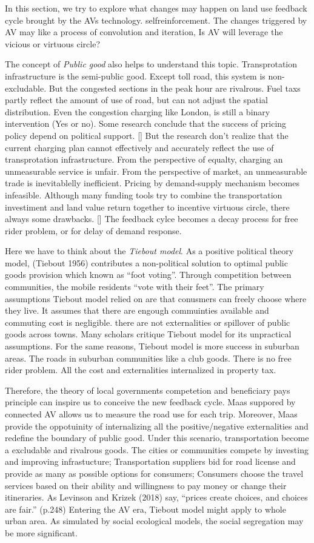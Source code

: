 \documentclass[12pt,]{article}
\begin{document}
In this section, we try to explore what changes may happen on land use
feedback cycle brought by the AVs technology. selfreinforcement. The
changes triggered by AV may like a process of convolution and iteration,
Is AV will leverage the vicious or virtuous circle?

The concept of \emph{Public good} also helps to understand this topic.
Transprotation infrastructure is the semi-public good. Except toll road,
this system is non-excludable. But the congested sections in the peak
hour are rivalrous. Fuel taxs partly reflect the amount of use of road,
but can not adjust the spatial distribution. Even the congestion
charging like London, is still a binary intervention (Yes or no). Some
research conclude that the success of pricing policy depend on political
support. {[}{]} But the research don't realize that the current charging
plan cannot effectively and accurately reflect the use of transprotation
infrastructure. From the perspective of equalty, charging an
unmeasurable service is unfair. From the perspective of market, an
unmeasurable trade is inevitablelly inefficient. Pricing by
demand-supply mechanism becomes infeasible. Although many funding tools
try to combine the transportation investiment and land value return
together to incentive virtuous circle, there always some drawbacks.
{[}{]} The feedback cylce becomes a decay process for free rider
problem, or for delay of demand response.

Here we have to think about the \emph{Tiebout model}. As a positive
political theory model, (Tiebout 1956) contributes a non-political
solution to optimal public goods provision which known as ``foot
voting''. Through competition between communities, the mobile residents
``vote with their feet''. The primary assumptions Tiebout model relied
on are that conusmers can freely choose where they live. It assumes that
there are engough commuinties available and commuting cost is
negligible. there are not externalities or spillover of public goods
across towns. Many scholars critique Tiebout model for its unpractical
assumptions. For the same reasons, Tiebout model is more success in
suburban areas. The roads in suburban communities like a club goods.
There is no free rider problem. All the cost and externalities
internalized in property tax.

Therefore, the theory of local governments competetion and beneficiary
pays principle can inspire us to conceive the new feedback cycle. Maas
suppored by connected AV allows us to measure the road use for each
trip. Moreover, Maas provide the oppotuinity of internalizing all the
positive/negative externalities and redefine the boundary of public
good. Under this scenario, transportation become a excludable and
rivalrous goods. The cities or communities compete by investing and
improving infrastucture; Transportation suppliers bid for road license
and provide as many as possible options for consumers; Consumers choose
the travel services based on their ability and willingness to pay money
or change their itineraries. As Levinson and Krizek (2018) say, ``prices
create choices, and choices are fair.'' (p.248) Entering the AV era,
Tiebout model might apply to whole urban area. As simulated by social
ecological models, the social segregation may be more significant.
\end{document}
